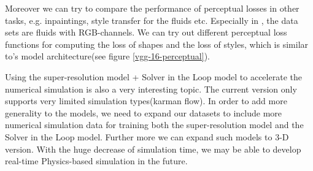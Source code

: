 \documentclass[a4paper,12pt,twoside]{report}
\begin{document}
Moreover we can try to compare the performance of perceptual losses in other tasks, e.g. inpaintings\cite{DBLP:journals/corr/abs-1712-03111}, style transfer for the fluids\cite{kim2020lagrangian} etc. Especially in \cite{kim2020lagrangian}, the data sets are fluids with RGB-channels. We can try out different perceptual loss functions for computing the loss of shapes and the loss of styles, which is similar to\cite{johnson2016perceptual}'s model architecture(see figure \ref{vgg-16-perceptual}).

Using the super-resolution model + Solver in the Loop model to accelerate the numerical simulation is also a very interesting topic. The current version only supports very limited simulation types(karman flow). In order to add more generality to the models, we need to expand our datasets to include more numerical simulation data for training both the super-resolution model and the Solver in the Loop model. Further more we can expand such models to 3-D version. With the huge decrease of simulation time, we may be able to develop real-time Physics-based simulation in the future.
\end{document}
